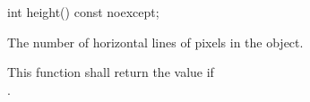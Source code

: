 \begin{itemdecl}
int height() const noexcept;
\end{itemdecl}
\begin{itemdescr}
\pnum
\returns
The number of horizontal lines of pixels in the  object.

\pnum
\remarks
This function shall return the value  if \\
.
\end{itemdescr}
